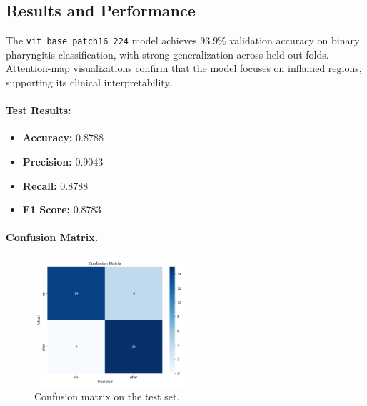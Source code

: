 \subsection{Results and Performance}
The \texttt{vit\_base\_patch16\_224} model achieves \(\mathbf{93.9\%}\) validation accuracy on binary pharyngitis classification, with strong generalization across held-out folds. Attention-map visualizations confirm that the model focuses on inflamed regions, supporting its clinical interpretability.

\paragraph{Test Results:}
\begin{itemize}
  \item \textbf{Accuracy:} 0.8788  
  \item \textbf{Precision:} 0.9043  
  \item \textbf{Recall:} 0.8788  
  \item \textbf{F1 Score:} 0.8783  
\end{itemize}

\paragraph{Confusion Matrix.}
\begin{figure}[h]
  \centering
  \includegraphics[width=0.5\textwidth]{images/phar_confusion_matrix.png}
  \caption{Confusion matrix on the test set.}
  \label{fig:phar_confusion_matrix}
\end{figure}

